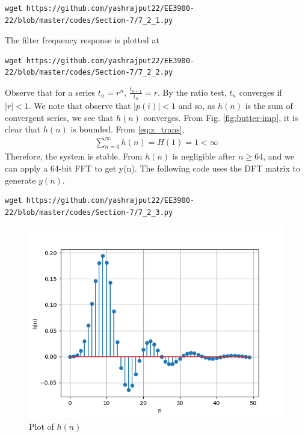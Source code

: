 \documentclass[journal,12pt,twocolumn]{IEEEtran}
\renewcommand\thesection{\arabic{section}}
\begin{document}
\begin{enumerate}[label=\thesection.\arabic*]
\begin{lstlisting}
wget https://github.com/yashrajput22/EE3900-22/blob/master/codes/Section-7/7_2_1.py
\end{lstlisting}
The filter frequency response is plotted at
\begin{lstlisting}
wget https://github.com/yashrajput22/EE3900-22/blob/master/codes/Section-7/7_2_2.py
\end{lstlisting}
Observe that for a series $t_n = r^n$, $\frac{t_{n + 1}}{t_n} = r$.
By the ratio test, $t_n$ converges if $|r| < 1$. We note that
observe that $|p(i)| < 1$ and so, as $h(n)$ is the sum of convergent series,
we see that $h(n)$ converges. From Fig. \eqref{fig:butter-imp}, it is clear
that $h(n)$ is bounded. From \eqref{eq:z_trans},
\begin{align}
	\sum_{n = 0}^{\infty}h(n) = H(1) = 1 < \infty
\end{align}
Therefore, the system is stable. From
$h(n)$ is negligible after $n \geq 64$, and we
can apply a 64-bit FFT to get y(n). The following code uses the DFT matrix
to generate $y(n)$.
\begin{lstlisting}
wget https://github.com/yashrajput22/EE3900-22/blob/master/codes/Section-7/7_2_3.py
\end{lstlisting}
\begin{figure}[!htb]
	\includegraphics[width=\columnwidth]{./figs/7_2_1.png}
	\caption{Plot of $h(n)$}
	\label{fig:butter-imp}
\end{figure}


\end{enumerate}
\end{document}
